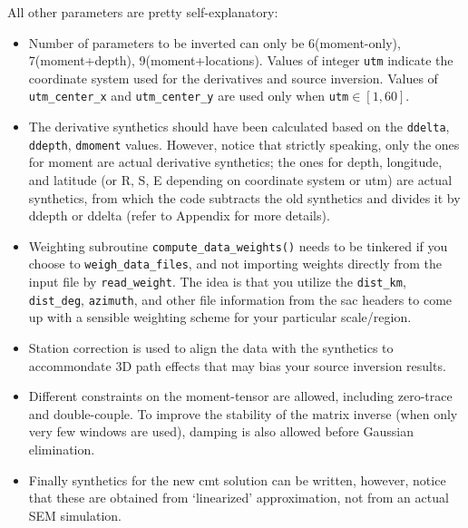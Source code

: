\documentclass[12pt,titlepage,fleqn]{article}
\begin{document}
All other parameters are pretty self-explanatory:
\begin{itemize}
 \item Number of parameters to be inverted can only be 6(moment-only), 7(moment+depth), 9(moment+locations). Values of integer \verb+utm+ indicate the coordinate system used for the derivatives and source inversion. Values of \verb+utm_center_x+ and \verb+utm_center_y+ are used only when \verb+utm+$\in [1,60]$.
 \item The derivative synthetics should have been calculated based on the \verb=ddelta=, \verb=ddepth=, \verb=dmoment= values. However, notice that strictly speaking, only the ones for moment are actual derivative synthetics; the ones for depth, longitude, and latitude (or R, S, E depending on coordinate system or utm) are actual synthetics, from which the code subtracts the old synthetics and divides it by ddepth or ddelta (refer to Appendix for more details). 
 \item Weighting subroutine \verb=compute_data_weights()=  needs to be tinkered if you choose to \verb=weigh_data_files=, and not importing weights directly from the input file by \verb=read_weight=. The idea is that you utilize the \verb=dist_km=, \verb=dist_deg=, \verb=azimuth=, and other file information from the sac headers to come up with a sensible weighting scheme for your particular scale/region.
 \item Station correction is used to align the data with the synthetics to accommondate 3D path effects that may bias your source inversion results.
 \item Different constraints on the moment-tensor are allowed, including zero-trace and double-couple. To improve the stability of the matrix inverse (when only very few windows are used), damping is also allowed before Gaussian elimination.
 \item Finally synthetics for the new cmt solution can be written, however, notice that these are obtained from `linearized' approximation, not from an actual SEM simulation.
 \end{itemize}
\end{document}
